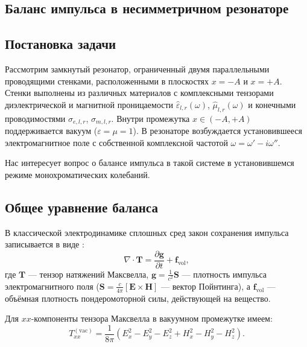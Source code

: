 \documentclass[a4paper,10pt]{article}
\newcommand{\modblock}[1]{\colorbox{modcolor!10}{\parbox{\dimexpr\linewidth-2\fboxsep}{#1}}}
\begin{document}
\modblock{

\section{Баланс импульса в несимметричном резонаторе}
\label{sec:momentum_balance}

\subsection{Постановка задачи}

Рассмотрим замкнутый резонатор, ограниченный двумя параллельными проводящими стенками,
расположенными в плоскостях $x = -A$ и $x = +A$. Стенки выполнены из различных материалов
с комплексными тензорами диэлектрической и магнитной
проницаемости $\hat{\varepsilon}_{l,r}(\omega)$, $\hat{\mu}_{l,r}(\omega)$ и конечными
проводимостями $\sigma_{e,l,r}$, $\sigma_{m,l,r}$. Внутри промежутка $x \in (-A, +A)$
поддерживается вакуум ($\varepsilon = \mu = 1$). В резонаторе возбуждается установившееся
электромагнитное поле с собственной комплексной частотой $\omega = \omega' - i\omega''$.

Нас интересует вопрос о балансе импульса в такой системе в установившемся режиме монохроматических колебаний.

\subsection{Общее уравнение баланса}

В классической электродинамике сплошных сред закон сохранения импульса записывается в виде \cite{Tamm1957,Landau_Lifshitz_8}:
\begin{equation}
\label{eq:momentum_general}
\nabla \cdot \mathbf{T} = \frac{\partial \mathbf{g}}{\partial t} + \mathbf{f}_{\mathrm{vol}},
\end{equation}
где $\mathbf{T}$ --- тензор натяжений Максвелла, $\mathbf{g} = \frac{1}{c^2}\mathbf{S}$ --- плотность импульса электромагнитного поля ($\mathbf{S} = \frac{c}{4\pi}[\mathbf{E}\times\mathbf{H}]$ --- вектор Пойнтинга), а $\mathbf{f}_{\mathrm{vol}}$ --- объёмная плотность пондеромоторной силы, действующей на вещество.

Для $xx$-компоненты тензора Максвелла в вакуумном промежутке имеем:
\begin{equation}
\label{eq:Txx_vacuum}
T_{xx}^{(\mathrm{vac})} = \frac{1}{8\pi}\left(
E_x^2 - E_y^2 - E_z^2 + H_x^2 - H_y^2 - H_z^2
\right).
\end{equation}

}
\end{document}
